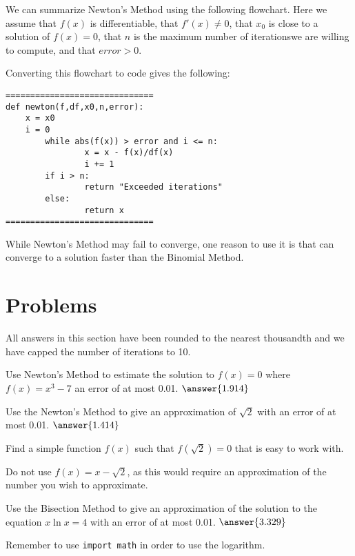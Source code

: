 \documentclass{ximera}
\begin{document}
We can summarize Newton's Method using the following flowchart. Here we assume that $f(x)$ is differentiable, that $f'(x)\neq 0$, that $x_0$ is close to a solution of $f(x)=0$, that $n$ is the maximum number of iterationswe are willing to compute, and that $error>0$.

\begin{center}
\end{center}

Converting this flowchart to code gives the following:

\begin{verbatim}
==============================
def newton(f,df,x0,n,error):
	x = x0
	i = 0
        while abs(f(x)) > error and i <= n:
                x = x - f(x)/df(x)
                i += 1
        if i > n:
                return "Exceeded iterations"
        else:
                return x
==============================
\end{verbatim}

While Newton's Method may fail to converge, one reason to use it is that can converge to a solution faster than the Binomial Method.

\section{Problems}

All answers in this section have been rounded to the nearest thousandth and we have capped the number of iterations to 10.

\begin{question}
	Use Newton's Method to estimate the solution to $f(x)=0$ where $f(x)=x^3-7$ an error of at most 0.01. $\answer{1.914}$ 
\end{question}

\begin{question}
	Use the Newton's Method to give an approximation of $\sqrt{2}$ with an error of at most 0.01. $\answer{1.414}$
	\begin{hint}
		Find a simple function $f(x)$ such that $f(\sqrt{2})=0$ that is easy to work with.
	\end{hint}
	\begin{hint}
		Do not use $f(x)=x-\sqrt{2}$, as this would require an approximation of the number you wish to approximate.
	\end{hint}
\end{question}

\begin{question}
	Use the Bisection Method to give an approximation of the solution to the equation $x\ln{x}=4$ with an error of at most 0.01. $\answer{3.329}$
	\begin{hint}
		Remember to use \verb|import math| in order to use the logarithm.
	\end{hint}
\end{question}
\end{document}
